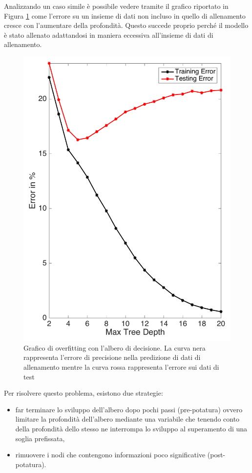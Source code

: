 \documentclass[12pt,italian]{report}
\begin{document}
Analizzando un caso simile è possibile vedere tramite il grafico riportato in Figura \ref{fig:overfit_decision_trees2} come l'errore su un insieme di dati non incluso in quello di allenamento cresce con l'aumentare della profondità. Questo succede proprio perché il modello è stato allenato adattandosi in maniera eccessiva all'insieme di dati di allenamento.
\begin{figure}[h!]
	\center
	\includegraphics[scale=0.18]{../img/overfit_decision_trees2} %
	\caption{Grafico di overfitting con l'albero di decisione. La curva nera rappresenta l'errore di precisione nella predizione di dati di allenamento mentre la curva rossa rappresenta l'errore sui dati di test}
	\label{fig:overfit_decision_trees2}
\end{figure}

Per risolvere questo problema, esistono due strategie:
\begin{itemize}
	\item far terminare lo sviluppo dell'albero dopo pochi passi (pre-potatura) ovvero limitare la profondità dell'albero mediante una variabile che tenendo conto della profondità dello stesso ne interrompa lo sviluppo al superamento di una soglia prefissata,
	
	\item rimuovere i nodi che contengono informazioni poco significative (post-potatura).
\end{itemize}
\end{document}
